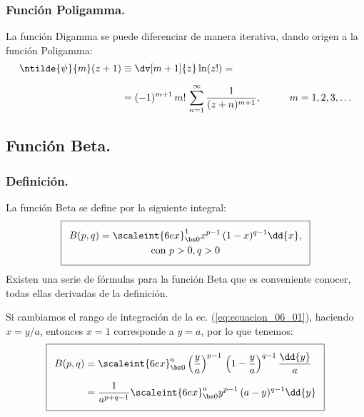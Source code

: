 \subsubsection{Función Poligamma.}

La función Digamma se puede diferenciar de manera iterativa, dando origen a la función Poligamma:
\begin{align}
\begin{aligned}
\ntilde{\psi}{m} (z + 1) &\equiv \dv[m+1]{z} \ln(z!) = \\[0.5em]
&= (-1)^{m+1} \, m! \,\sum_{n=1}^{\infty} \dfrac{1}{(z + n)^{m+1}}, \hspace{1cm} m = 1, 2, 3, \ldots
\end{aligned}
\label{eq:ecuacion_10_41}
\end{align}

\subsection{Función Beta.}

\subsubsection{Definición.}

La función Beta se define por la siguiente integral:
\begin{align} \addtolength{\fboxsep}{5pt}\boxed{
\begin{gathered}
B(p, q) = \scaleint{6ex}_{\bs 0}^{1} x^{p-1} \, (1- x )^{q-1} \dd{x}, \\
\mbox{con }  p > 0, q > 0
\end{gathered}}
\label{eq:ecuacion_06_01}
\end{align}
Existen una serie de fórmulas para la función Beta que es conveniente conocer, todas ellas derivadas de la definición.
\par
Si cambiamos el rango de integración de la ec. (\ref{eq:ecuacion_06_01}), haciendo $x = y/a$, entonces $x = 1$ corresponde a $y = a$, por lo que tenemos:
\begin{align} \addtolength{\fboxsep}{5pt}\boxed{
\begin{aligned}
B (p, q) &= \scaleint{6ex}_{\bs 0}^{a} \left( \dfrac{y}{a}\right)^{p-1} \, \left( 1 - \dfrac{y}{a}\right)^{q-1} \dfrac{\dd{y}}{a} \\[0.5em]
&= \dfrac{1}{a^{p+q-1}} \scaleint{6ex}_{\bs 0}^{a} y^{p-1} \, (a - y)^{q-1} \dd{y}
\end{aligned}
\label{eq:ecuacion_06_03}
}
\end{align}

